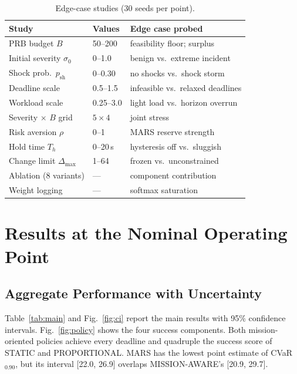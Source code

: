 \documentclass[conference]{IEEEtran}
\newcommand{\figref}[1]{Fig.~\ref{#1}}
\begin{document}
\begin{table}[t]
\centering
\caption{Edge-case studies (30 seeds per point).}
\label{tab:edge}
\scriptsize
\begin{tabular}{lll}
\toprule
Study & Values & Edge case probed\\
\midrule
PRB budget $B$ & 50--200 & feasibility floor; surplus\\
Initial severity $\sigma_0$ & 0--1.0 & benign vs.\ extreme incident\\
Shock prob.\ $p_{\mathrm{sh}}$ & 0--0.30 & no shocks vs.\ shock storm\\
Deadline scale & 0.5--1.5 & infeasible vs.\ relaxed deadlines\\
Workload scale & 0.25--3.0 & light load vs.\ horizon overrun\\
Severity $\times$ $B$ grid & $5\times4$ & joint stress\\
Risk aversion $\rho$ & 0--1 & MARS reserve strength\\
Hold time $T_h$ & 0--20\,s & hysteresis off vs.\ sluggish\\
Change limit $\Delta_{\max}$ & 1--64 & frozen vs.\ unconstrained\\
Ablation (8 variants) & --- & component contribution\\
Weight logging & --- & softmax saturation\\
\bottomrule
\end{tabular}
\end{table}

\section{Results at the Nominal Operating Point}
\subsection{Aggregate Performance with Uncertainty}
Table~\ref{tab:main} and \figref{fig:ci} report the main results with 95\% confidence intervals. \figref{fig:policy} shows the four success components. Both mission-oriented policies achieve every deadline and quadruple the success score of STATIC and PROPORTIONAL. MARS has the lowest point estimate of CVaR$_{0.90}$, but its interval [22.0, 26.9] overlaps MISSION-AWARE's [20.9, 29.7].
\end{document}

